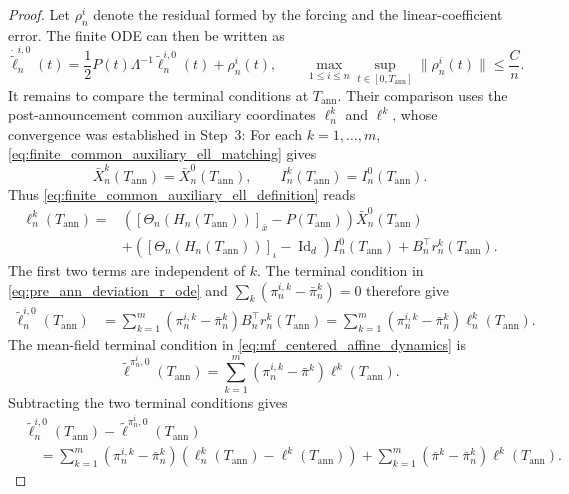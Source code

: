 \documentclass[12pt]{article}
\numberwithin{equation}{section}
\theoremstyle{definition}
\begin{document}
\begin{proof}
Let \(\rho_n^i\)
denote the residual formed by the forcing and the linear-coefficient error.
The finite ODE can then be written as
\begin{equation}\label{eq:finite_centered_projection_ode}
\dot{\widetilde\ell}_n^{i,0}(t)
=
\frac12P(t)\Lambda^{-1}\widetilde\ell_n^{i,0}(t)+\rho_n^i(t),
\qquad
\max_{1\le i\le n}
\sup_{t\in[0,T_{\mathrm{ann}}]}
\|\rho_n^i(t)\|
\leq
\frac{C}{n}.
\end{equation}
It remains to compare the terminal conditions at
\(T_{\mathrm{ann}}\). Their comparison uses the post-announcement common
auxiliary coordinates \(\ell_n^k\) and \(\ell^k\), whose convergence was
established in Step~3: For each \(k=1,\ldots,m\),
\eqref{eq:finite_common_auxiliary_ell_matching} gives
\[
\bar X_n^k(T_{\mathrm{ann}})=\bar X_n^0(T_{\mathrm{ann}}),
\qquad
I_n^k(T_{\mathrm{ann}})=I_n^0(T_{\mathrm{ann}}).
\]
Thus \eqref{eq:finite_common_auxiliary_ell_definition} reads
\[
\begin{aligned}
\ell_n^k(T_{\mathrm{ann}})
={}&
\left(
[\Theta_n(H_n(T_{\mathrm{ann}}))]_{\bar x}-P(T_{\mathrm{ann}})
\right)\bar X_n^0(T_{\mathrm{ann}})
\\
&+
\left(
[\Theta_n(H_n(T_{\mathrm{ann}}))]_{\iota}-\operatorname{Id}_d
\right)I_n^0(T_{\mathrm{ann}})
+B_n^\top r_n^k(T_{\mathrm{ann}}).
\end{aligned}
\]
The first two terms are independent of \(k\). The terminal condition in
\eqref{eq:pre_ann_deviation_r_ode} and
\(\sum_k(\pi_n^{i,k}-\bar\pi_n^k)=0\) therefore give
\[
\begin{aligned}
\widetilde\ell_n^{i,0}(T_{\mathrm{ann}})
&=
\sum_{k=1}^m
(\pi_n^{i,k}-\bar\pi_n^k)
B_n^\top r_n^k(T_{\mathrm{ann}})
=
\sum_{k=1}^m
(\pi_n^{i,k}-\bar\pi_n^k)\ell_n^k(T_{\mathrm{ann}}).
\end{aligned}
\]
The mean-field terminal condition in
\eqref{eq:mf_centered_affine_dynamics} is
\[
\widetilde\ell^{\pi_n^i,0}(T_{\mathrm{ann}})
=
\sum_{k=1}^m
(\pi_n^{i,k}-\bar\pi^k)\ell^k(T_{\mathrm{ann}}).
\]
Subtracting the two terminal conditions gives
\begin{equation}\label{eq:finite_centered_terminal_error_identity}
\begin{aligned}
&\widetilde\ell_n^{i,0}(T_{\mathrm{ann}})
-\widetilde\ell^{\pi_n^i,0}(T_{\mathrm{ann}})
\\
&\quad=
\sum_{k=1}^m
(\pi_n^{i,k}-\bar\pi_n^k)
\left(
\ell_n^k(T_{\mathrm{ann}})
-\ell^k(T_{\mathrm{ann}})
\right)
+
\sum_{k=1}^m
(\bar\pi^k-\bar\pi_n^k)
\ell^k(T_{\mathrm{ann}}).
\end{aligned}

\end{equation}
\end{proof}
\end{document}
